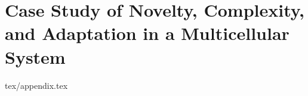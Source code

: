 \chapter{Case Study of Novelty, Complexity, and Adaptation in a Multicellular System}
\label{ch:measuring-cna-appendix}

{tex/appendix.tex}

